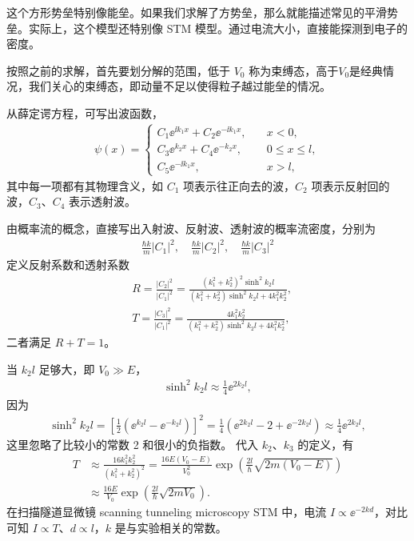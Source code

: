 这个方形势垒特别像能垒。如果我们求解了方势垒，那么就能描述常见的平滑势垒。实际上，这个模型还特别像 STM 模型。通过电流大小，直接能探测到电子的密度。

按照之前的求解，首先要划分解的范围，低于 $V_0$ 称为束缚态，高于$V_0$是经典情况，我们关心的束缚态，即动量不足以使得粒子越过能垒的情况。

从薛定谔方程，可写出波函数，
\begin{align}
    \psi(x) = \begin{cases}
        C_1 \ee^{\ii k_1 x} + C_2 \ee^{-\ii k_1 x},\quad &x<0, \\
        C_3 \ee^{k_2 x} + C_4 \ee^{-k_2 x},\quad &0\leqslant x \leqslant l,\\
        C_5 \ee^{-\ii k_1 x}, \quad &x>l,
    \end{cases}
\end{align}
其中每一项都有其物理含义，如 $C_1$ 项表示往正向去的波，$C_2$ 项表示反射回的波，$C_3$、$C_4$ 表示透射波。

由概率流的概念，直接写出入射波、反射波、透射波的概率流密度，分别为
\begin{align}
    \frac{\hbar k}{m} |C_1|^2, \quad \frac{\hbar k}{m} |C_2|^2, \quad \frac{\hbar k}{m} |C_3|^2
\end{align}
定义反射系数和透射系数
\begin{align}
    &R = \frac{|C_2|^2}{|C_1|^2} = 
    \frac{(k_1^2 + k_2^2)^2 \sinh^2  k_2 l} {(k_1^2 + k_2^2) \sinh^2 k_2l + 4 k_1^2 k_2^2}, \\
    &T = \frac{|C_3|^2}{|C_1|^2} = 
    \frac{4 k_1^2 k_2^2} {(k_1^2 + k_2^2) \sinh^2 k_2l + 4 k_1^2 k_2^2},
\end{align}
二者满足 $R+T=1$。

当 $k_2l$ 足够大，即 $V_0 \gg E$，
\begin{align}
    \sinh^2 k_2l \approx \frac 14 \ee^{2k_2 l},
\end{align}
因为
\begin{align}
    \sinh^2 k_2 l = \left[\frac12\left(\ee^{k_2l} - \ee^{-k_2l}\right)\right]^2 = \frac14 \left(\ee^{2k_2 l} - 2 + \ee^{-2k_2 l}\right) \approx \frac 14 \ee^{2k_2 l},
\end{align}
这里忽略了比较小的常数 2 和很小的负指数。
代入 $k_2$、$k_3$ 的定义，有
\begin{align}
    T &\approx \frac{16 k_1^2 k_2^2}{(k_1^2 + k_2^2)^2} = \frac{16E(V_0 - E)}{V_0^2} \exp\left(\frac{2l}{\hbar}\sqrt{2m(V_0 - E)}\right) \\
    &\approx \frac{16 E}{V_0} \exp\left(\frac{2l}{\hbar}\sqrt{2m V_0}\right). 
\end{align}
在扫描隧道显微镜 scanning tunneling microscopy STM 中，电流 $I \propto \ee^{-2 k d}$，对比可知 $I \propto T$、$d\propto l$，$k$ 是与实验相关的常数。

